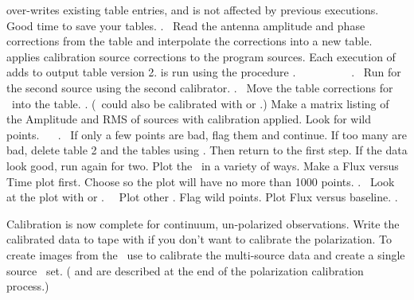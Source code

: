     over-writes existing \SU table entries, and is not
   affected by previous executions.
 Good time to save your tables.
   .~
 Read the antenna amplitude and phase corrections
   from the \SN table and interpolate the corrections into a new \CL
   table.   applies calibration source corrections to the
   program sources.  Each execution of  adds to output
   \CL table version 2.   is run using the procedure
   .~  ~
   ~
   ~ ~
   ~ .~ Run  for
   the second source using the second calibrator.  .~
   Move the \SN table corrections for \TCTES\ into the \CL table.
   .
   (\TCTES\ could also be calibrated with  or .)
 Make a matrix listing of the Amplitude and RMS
   of  sources with calibration applied.  Look for
   wild points.~
~
.~
   If only a few points are bad, flag them and continue.  If too many
   are bad, delete \CL table 2 and the \SN tables using
   .  Then return to the first  step.  If
   the data look good, run  again for \IF two.
 Plot the \uvdata\ in a variety of ways.  Make a
   Flux versus Time plot first.  Choose  so the plot will
   have no more than 1000 points.
   .~
   Look at the plot with  or .~~
   Plot other \IF. Flag wild points. Plot Flux versus baseline.
   .
\eeddes

Calibration is now complete for continuum, un-polarized observations.
Write the calibrated data to tape with  if you don't want
to calibrate the polarization.  To create images from the \uvdata\ use
 to calibrate the multi-source data and create a single
source \uvdata\ set.  ( and  are described
at the end of the polarization calibration process.)

